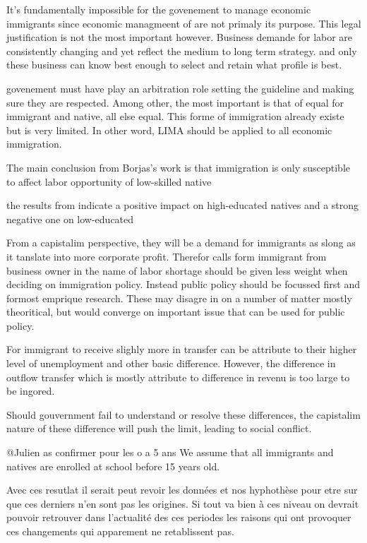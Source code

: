 It's fundamentally impossible for the govenement to manage economic immigrants since economic managmeent of are not primaly its purpose. This legal justification is not the most important however. Business demande for labor  are consistently changing and yet reflect the medium to long term strategy. and only these business can know best enough to select and retain what profile is best.

govenement must have play an arbitration role setting the guideline and making sure they are respected. Among other, the most important is that of equal for immigrant and native, all else equal. This forme of immigration already existe but is very limited. In other word, LIMA should be applied to all economic immigration.



The main conclusion from Borjas's work is that immigration is only susceptible to affect labor  opportunity of low-skilled native\citep{picheTheoriesMigratoiresContemporaines2013}

the results from \citet{fusaroImpactImmigrationNative2018} indicate a positive impact on high-educated natives and a strong negative one on low-educated



From a capistalim perspective, they will be a demand for immigrants as slong as it tanslate into more corporate profit. Therefor calls form immigrant from business owner in the name of labor  shortage should be given less weight when deciding on immigration policy. Instead public policy should be focussed first and formost emprique research. These may disagre in on a number of matter mostly theoritical, but would converge on important issue that can be used for public policy.

For immigrant to receive slighly more in transfer can be attribute to their higher level of unemployment and other basic difference. However, the difference in outflow transfer which is mostly attribute to difference in revenu is too large to be ingored.

Should gouvernment fail to understand or resolve these differences, the capistalim nature of these difference will push the limit, leading to social conflict.





@Julien
as confirmer pour les o a 5 ans
We assume that all immigrants and natives are enrolled at school before 15 years old.

Avec ces resutlat il serait peut revoir les données et nos hyphothèse pour etre sur que ces derniers n'en sont pas les origines. Si tout va bien à ces niveau on devrait pouvoir retrouver dans l'actualité des ces periodes les raisons qui ont provoquer ces changements qui apparement ne retablissent pas.

